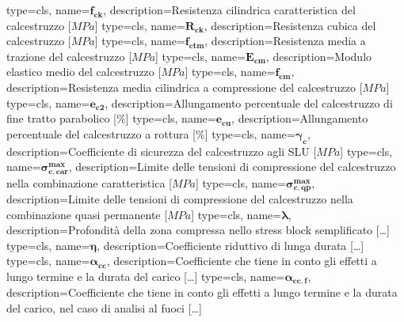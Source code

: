 {
    type=cls,
    name=\ensuremath{\boldsymbol{f_{ck}}},
    description={Resistenza cilindrica caratteristica del calcestruzzo [$MPa$]}
}
{
    type=cls,
    name=\ensuremath{\boldsymbol{R_{ck}}},
    description={Resistenza cubica del calcestruzzo [$MPa$]}
}
{
    type=cls,
    name=\ensuremath{\boldsymbol{f_{ctm}}},
    description={Resistenza media a trazione del calcestruzzo [$MPa$]}
}
{
    type=cls,
    name=\ensuremath{\boldsymbol{E_{cm}}},
    description={Modulo elastico medio del calcestruzzo [$MPa$]}
}
{
    type=cls,
    name=\ensuremath{\boldsymbol{f_{cm}}},
    description={Resistenza media cilindrica a compressione del calcestruzzo [$MPa$]}
}
{
    type=cls,
    name=\ensuremath{\boldsymbol{e_{c2}}},
    description={Allungamento percentuale del calcestruzzo di fine tratto parabolico [$\%$]}
}
{
    type=cls,
    name=\ensuremath{\boldsymbol{e_{cu}}},
    description={Allungamento percentuale del calcestruzzo a rottura [$\%$]}
}
{
    type=cls,
    name=\ensuremath{\boldsymbol{\gamma_c}},
    description={Coefficiente di sicurezza del calcestruzzo agli SLU [$MPa$]}
}
{
    type=cls,
    name=\ensuremath{\boldsymbol{\sigma^{max}_{c,car}}},
    description={Limite delle tensioni di compressione del calcestruzzo nella combinazione caratteristica [$MPa$]}
}
{
    type=cls,
    name=\ensuremath{\boldsymbol{\sigma^{max}_{c,qp}}},
    description={Limite delle tensioni di compressione del calcestruzzo nella combinazione quasi permanente [$MPa$]}
}
{
    type=cls,
    name=\ensuremath{\boldsymbol{\lambda}},
    description={Profondità della zona compressa nello stress block semplificato [\dots]}
}
{
    type=cls,
    name=\ensuremath{\boldsymbol{\eta}},
    description={Coefficiente riduttivo di lunga durata [\dots]}
}
{
    type=cls,
    name=\ensuremath{\boldsymbol{\alpha_{cc}}},
    description={Coefficiente che tiene in conto gli effetti a lungo termine e la durata del carico [\dots]}
}
{
    type=cls,
    name=\ensuremath{\boldsymbol{\alpha_{cc,f}}},
    description={Coefficiente che tiene in conto gli effetti a lungo termine e la durata del carico, nel caso di analisi al fuoci [\dots]}
}
